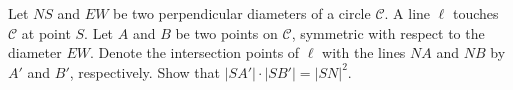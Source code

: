 Let $NS$ and $EW$ be two perpendicular diameters of a circle $\mathcal{C}$. A line $\ell$ touches $\mathcal{C}$ at point $S$. Let $A$ and $B$ be two points on $\mathcal{C}$,  symmetric with respect to the diameter $EW$. Denote the intersection points of $\ell$ with the lines $NA$ and $NB$ by $A'$ and $B'$,  respectively. Show that $|SA'|\cdot |SB'|=|SN|^2$.